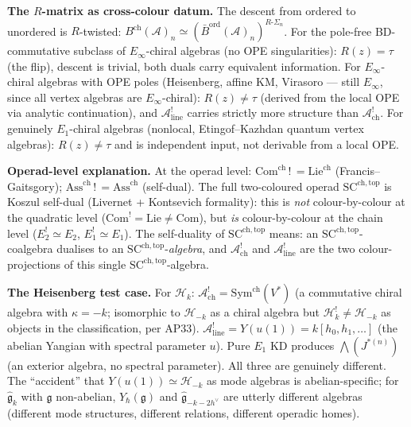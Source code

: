 \documentclass[11pt]{article}
\newcommand{\cA}{\mathcal{A}}
\newcommand{\cH}{\mathcal{H}}
\newcommand{\fg}{\mathfrak{g}}
\begin{document}
\medskip\noindent\textbf{The $R$-matrix as cross-colour datum.}\enspace
The descent from ordered to unordered is $R$-twisted:
$B^{\mathrm{ch}}(\cA)_n \simeq
(\bar{B}^{\mathrm{ord}}(\cA)_n)^{R\text{-}\Sigma_n}$.
For the pole-free BD-commutative subclass of
$E_\infty$-chiral algebras (no OPE singularities):
$R(z) = \tau$ (the flip), descent is trivial, both
duals carry equivalent information.  For
$E_\infty$-chiral algebras with OPE poles
(Heisenberg, affine KM, Virasoro --- still $E_\infty$,
since all vertex algebras are $E_\infty$-chiral):
$R(z) \neq \tau$ (derived from the local OPE via
analytic continuation), and $\cA^!_{\mathrm{line}}$
carries strictly more structure than
$\cA^!_{\mathrm{ch}}$.  For genuinely $E_1$-chiral
algebras (nonlocal, Etingof--Kazhdan quantum vertex
algebras): $R(z) \neq \tau$ and is independent
input, not derivable from a local OPE.

\medskip\noindent\textbf{Operad-level explanation.}\enspace
At the operad level:
$\mathrm{Com}^{\mathrm{ch}} \,!\, = \mathrm{Lie}^{\mathrm{ch}}$
(Francis--Gaitsgory);
$\mathrm{Ass}^{\mathrm{ch}} \,!\, = \mathrm{Ass}^{\mathrm{ch}}$
(self-dual).  The full two-coloured operad
$\mathrm{SC}^{\mathrm{ch,top}}$ is Koszul self-dual
(Livernet + Kontsevich formality): this is \emph{not}
colour-by-colour at the quadratic level
($\mathrm{Com}^! = \mathrm{Lie} \neq \mathrm{Com}$), but
\emph{is} colour-by-colour at the chain level
($E_2^! \simeq E_2$, $E_1^! \simeq E_1$).  The self-duality
of $\mathrm{SC}^{\mathrm{ch,top}}$ means: an
$\mathrm{SC}^{\mathrm{ch,top}}$-coalgebra dualises to an
$\mathrm{SC}^{\mathrm{ch,top}}$-\emph{algebra}, and
$\cA^!_{\mathrm{ch}}$ and $\cA^!_{\mathrm{line}}$ are the
two colour-projections of this single
$\mathrm{SC}^{\mathrm{ch,top}}$-algebra.

\medskip\noindent\textbf{The Heisenberg test case.}\enspace
For $\cH_k$: $\cA^!_{\mathrm{ch}} = \mathrm{Sym}^{\mathrm{ch}}(V^*)$
(a commutative chiral algebra with $\kappa = -k$;
isomorphic to $\cH_{-k}$ as a chiral algebra but
$\cH_k^! \neq \cH_{-k}$ as objects in the classification,
per AP33).  $\cA^!_{\mathrm{line}} = Y(u(1)) = k[h_0, h_1, \ldots]$
(the abelian Yangian with spectral parameter $u$).
Pure $E_1$ KD produces $\bigwedge(J^{*(n)})$ (an exterior algebra,
no spectral parameter).  All three are genuinely different.
The ``accident'' that $Y(u(1)) \simeq \cH_{-k}$ as mode algebras
is abelian-specific; for $\widehat{\fg}_k$ with $\fg$ non-abelian,
$Y_\hbar(\fg)$ and $\widehat{\fg}_{-k-2h^\vee}$ are utterly
different algebras (different mode structures, different relations,
different operadic homes).
\end{document}
